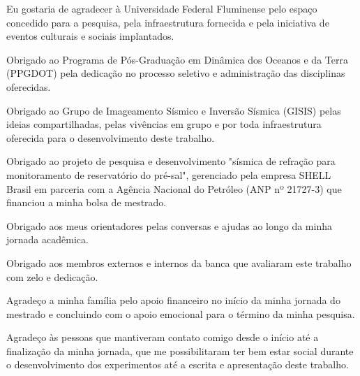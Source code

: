 \begin{agradecimentos}
    \fonteAgradecimentos 
    
	Eu gostaria de agradecer à Universidade Federal Fluminense pelo espaço concedido para a pesquisa, pela infraestrutura fornecida e pela iniciativa de eventos culturais e sociais implantados. 
	
	Obrigado ao Programa de Pós-Graduação em Dinâmica dos Oceanos e da Terra (PPGDOT) pela dedicação no processo seletivo e administração das disciplinas oferecidas. 
	
	Obrigado ao Grupo de Imageamento Sísmico e Inversão Sísmica (GISIS) pelas ideias compartilhadas, pelas vivências em grupo e por toda infraestrutura oferecida para o desenvolvimento deste trabalho. 
	
	Obrigado ao projeto de pesquisa e desenvolvimento "sísmica de refração para monitoramento de reservatório do pré-sal", gerenciado pela empresa SHELL Brasil em parceria com a Agência Nacional do Petróleo (ANP nº 21727-3) que financiou a minha bolsa de mestrado. 
	
	Obrigado aos meus orientadores pelas conversas e ajudas ao longo da minha jornada acadêmica. 
	
	Obrigado aos membros externos e internos da banca que avaliaram este trabalho com zelo e dedicação. 
	
	Agradeço a minha família pelo apoio financeiro no início da minha jornada do mestrado e concluindo com o apoio emocional para o término da minha pesquisa. 
	
	Agradeço às pessoas que mantiveram contato comigo desde o início até a finalização da minha jornada, que me possibilitaram ter bem estar social durante o desenvolvimento dos experimentos até a escrita e apresentação deste trabalho.         
    
\end{agradecimentos}